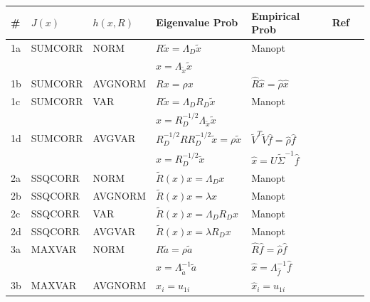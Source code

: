 \begin{table}[!h]
\small
  \centering
  \begin{tabular}{lllllll}\toprule
    \# & $J(x)$ & $h(x,R)$  & Eigenvalue Prob & Empirical Prob & Ref\\
    \midrule
    1a & SUMCORR & NORM & $R \widetilde{x} = \Lambda_D\widetilde{x}$ & Manopt &
    \cite{nielsen2002multiset,nielsen1994analysis}\\ 
    &&&$x = \Lambda_{\widetilde{x}}\widetilde{x}$ &&\\
    1b & SUMCORR & AVGNORM & $R x = \rho x$ &
    $\widehat{R}\widehat{x} = \widehat{\rho}\widehat{x}$&
    \cite{nielsen1994analysis}\\ 
    1c & SUMCORR & VAR & $R\widetilde{x}=\Lambda_DR_D\widetilde{x}$  & Manopt&
    \cite{nielsen2002multiset,kettenring1971canonical,nielsen1994analysis}\\
    &&&$x = R_D^{-1/2}\Lambda_{\widetilde{x}}\widetilde{x}$&&\\
    1d & SUMCORR & AVGVAR &  $R_D^{-1/2}RR_D^{-1/2}\widetilde{x}=\rho\widetilde{x}$&
    $\widetilde{V}^T\widetilde{V}\widehat{f}=\widehat{\rho}\widehat{f}$ &
    \cite{deleus2011functional,nielsen2002multiset,via2005canonical}\\ 
    &&&$x=R_D^{-1/2}\widetilde{x}$&$\widehat{x}=U\widetilde{\Sigma}^{-1}\widehat{f}$&
    \cite{nielsen1994analysis,yu2007learning}\\  
    \midrule
    2a & SSQCORR & NORM & $\widetilde{R}(x)x = \Lambda_Dx$ & Manopt &
    \cite{nielsen1994analysis}\\  
    2b & SSQCORR & AVGNORM & $\widetilde{R}(x)x = \lambda x$ & Manopt &
    \cite{nielsen1994analysis}\\ 
    2c & SSQCORR & VAR & $\widetilde{R}(x)x= \Lambda_DR_Dx$ & Manopt &
    \cite{correa2010canonical,kettenring1971canonical,nielsen1994analysis}\\ 
    2d & SSQCORR & AVGVAR & $\widetilde{R}(x)x=\lambda R_Dx$ & Manopt&
    \cite{nielsen1994analysis}\\ 
    \midrule
    3a & MAXVAR & NORM & $R\tilde{a} = \rho\tilde{a}$ &
    $\widehat{R} \widehat{f}=\widehat{\rho} \widehat{f}$&
    \cite{nielsen1994analysis}\\ 
    &&&$x=\Lambda_{\tilde{a}}^{-1}\tilde{a}$&
    $\widehat{x}=\Lambda_{\widehat{f}}^{-1}\widehat{f}$ &\\ 
    3b & MAXVAR & AVGNORM & $x_i=u_{1i}$ &
    $\widehat{x}_i = u_{1i}$ &
    \cite{nielsen1994analysis}\\ 

\end{tabular}
\end{table}
